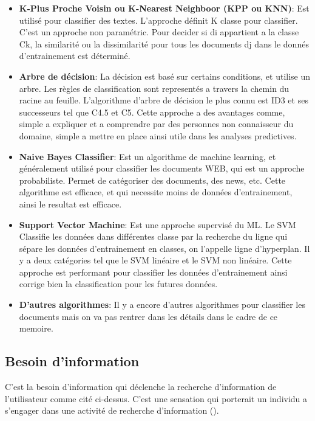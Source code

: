 \begin{itemize}
    \item \textbf{K-Plus Proche Voisin ou K-Nearest Neighboor (KPP ou KNN)}: Est utilisé pour classifier des textes. L'approche définit K classe pour classifier. C'est un approche non paramétric. Pour decider si di appartient a la classe Ck, la similarité ou la dissimilarité pour tous les documents dj dans le donnés d'entrainement est déterminé.
    \item \textbf{Arbre de décision}: La décision est basé sur certains conditions, et utilise un arbre. Les règles de classification sont representés a travers la chemin du racine au feuille. L'algorithme d'arbre de décision le plus connu est ID3 et ses successeurs tel que C4.5 et C5. Cette approche a des avantages comme, simple a expliquer et a comprendre par des personnes non connaisseur du domaine, simple a mettre en place ainsi utile dans les analyses predictives.
    \item \textbf{Naive Bayes Classifier}: Est un algorithme de machine learning, et généralement utilisé pour classifier les documents WEB, qui est un approche probabiliste. Permet de catégoriser des documents, des news, etc. Cette algorithme est efficace, et qui necessite moins de données d'entrainement, ainsi le resultat est efficace.
    \item \textbf{Support Vector Machine}: Est une approche supervisé du ML. Le SVM Classifie les données dans différentes classe par la recherche du ligne qui sépare les données d'entrainement en classes, on l'appelle ligne d'hyperplan. Il y a deux catégories tel que le SVM linéaire et le SVM non linéaire. Cette approche est performant pour classifier les données d'entrainement ainsi corrige bien la classification pour les futures données.
    \item \textbf{D'autres algorithmes}: Il y a encore d'autres algorithmes pour classifier les documents mais on va pas rentrer dans les détails dans le cadre de ce memoire.
\end{itemize}

\subsection{Besoin d'information}
\label{sec:besoin-information}
\begin{definition}
    C'est la besoin d'information qui déclenche la recherche d'information de l'utilisateur comme cité ci-dessus. C'est une sensation qui porterait un individu a s'engager dans une activité de recherche d'information (\cite{thesaurus-ir-web}).
\end{definition}

